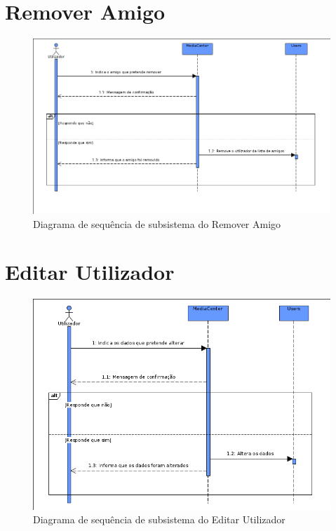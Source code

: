 \documentclass[a4paper]{report}
\begin{document}
\section{Remover Amigo}
\begin{figure}[H]
	\centering 
    \includegraphics[width=\textwidth]{images/remamigoSub.png}  
    \caption{Diagrama de sequência de subsistema do Remover Amigo}
\end{figure}

\section{Editar Utilizador}
\begin{figure}[H]
	\centering 
    \includegraphics[width=\textwidth]{images/edituserSub.png}  
    \caption{Diagrama de sequência de subsistema do Editar Utilizador}
\end{figure}
\end{document}
